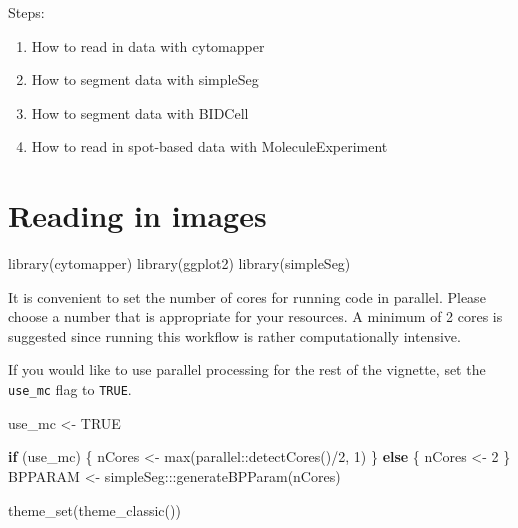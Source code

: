 \documentclass[
  letterpaper,
  DIV=11,
  numbers=noendperiod]{scrreprt}
\newenvironment{Shaded}{\begin{snugshade}}{\end{snugshade}}
\newcommand{\ConstantTok}[1]{\textcolor[rgb]{0.56,0.35,0.01}{#1}}
\newcommand{\ControlFlowTok}[1]{\textcolor[rgb]{0.00,0.23,0.31}{\textbf{#1}}}
\newcommand{\DecValTok}[1]{\textcolor[rgb]{0.68,0.00,0.00}{#1}}
\newcommand{\FunctionTok}[1]{\textcolor[rgb]{0.28,0.35,0.67}{#1}}
\newcommand{\NormalTok}[1]{\textcolor[rgb]{0.00,0.23,0.31}{#1}}
\newcommand{\OtherTok}[1]{\textcolor[rgb]{0.00,0.23,0.31}{#1}}
\newcommand{\SpecialCharTok}[1]{\textcolor[rgb]{0.37,0.37,0.37}{#1}}
\providecommand{\tightlist}{%
  \setlength{\itemsep}{0pt}\setlength{\parskip}{0pt}}\usepackage{longtable,booktabs,array}
\begin{document}
Steps:

\begin{enumerate}
\def\labelenumi{\arabic{enumi}.}
\tightlist
\item
  How to read in data with cytomapper
\item
  How to segment data with simpleSeg
\item
  How to segment data with BIDCell
\item
  How to read in spot-based data with MoleculeExperiment
\end{enumerate}

\section{Reading in images}\label{reading-in-images}

\begin{Shaded}
\begin{Highlighting}[]
\FunctionTok{library}\NormalTok{(cytomapper)}
\FunctionTok{library}\NormalTok{(ggplot2)}
\FunctionTok{library}\NormalTok{(simpleSeg)}
\end{Highlighting}
\end{Shaded}

It is convenient to set the number of cores for running code in
parallel. Please choose a number that is appropriate for your resources.
A minimum of 2 cores is suggested since running this workflow is rather
computationally intensive.

If you would like to use parallel processing for the rest of the
vignette, set the \texttt{use\_mc} flag to \texttt{TRUE}.

\begin{Shaded}
\begin{Highlighting}[]
\NormalTok{use\_mc }\OtherTok{\textless{}{-}} \ConstantTok{TRUE}

\ControlFlowTok{if}\NormalTok{ (use\_mc) \{}
\NormalTok{  nCores }\OtherTok{\textless{}{-}} \FunctionTok{max}\NormalTok{(parallel}\SpecialCharTok{::}\FunctionTok{detectCores}\NormalTok{()}\SpecialCharTok{/}\DecValTok{2}\NormalTok{, }\DecValTok{1}\NormalTok{)}
\NormalTok{\} }\ControlFlowTok{else}\NormalTok{ \{}
\NormalTok{  nCores }\OtherTok{\textless{}{-}} \DecValTok{2}
\NormalTok{\}}
\NormalTok{BPPARAM }\OtherTok{\textless{}{-}}\NormalTok{ simpleSeg}\SpecialCharTok{:::}\FunctionTok{generateBPParam}\NormalTok{(nCores)}

\FunctionTok{theme\_set}\NormalTok{(}\FunctionTok{theme\_classic}\NormalTok{())}
\end{Highlighting}
\end{Shaded}
\end{document}
